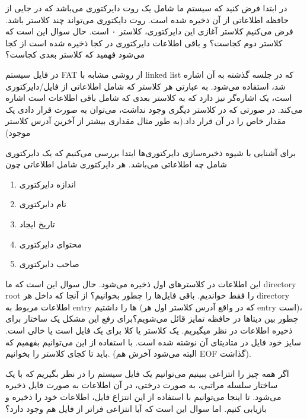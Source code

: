 \begin{flushright}
    در ابتدا فرض کنید که سیستم ما شامل یک روت دایرکتوری می‌باشد که در جایی از حافظه اطلاعاتی از آن ذخیره شده است.
    روت دایکتوری می‌تواند چند کلاستر باشد.
    فرض می‌کنیم کلاستر آغازی این دایرکتوری، کلاستر ۰ است.
    حال سوال این است که کلاستر دوم کجاست؟ و باقی اطلاعات دایرکتوری در کجا ذخیره شده است از کجا می‌شود فهمید که کلاستر بعدی کجاست؟


    در فایل سیستم FAT از روشی مشابه با linked list که در جلسه گذشته به آن اشاره شد، استفاده می‌شود.
    به عبارتی هر کلاستر که شامل اطلاعاتی از فایل/دایرکتوری است، یک اشاره‌گر نیز دارد که به کلاستر بعدی که شامل باقی اطلاعات است اشاره می‌کند.
    در صورتی که در کلاستر دیگری وجود نداشت، می‌توان به صورت قرار دادی یک مقدار خاص را در آن قرار داد.(به طور مثال مقداری بیشتر از آخرین آدرس کلاستر موجود)


    برای آشنایی با شیوه ذخیره‌سازی دایرکتوری‌ها ابتدا بررسی می‌کنیم که یک دایرکتوری شامل چه اطلاعاتی می‌باشد.
    هر دایرکتوری شامل اطلاعاتی چون
    \begin{enumerate}
        \item اندازه دایرکتوری
        \item نام دایرکتوری
        \item تاریخ ایجاد
        \item محتوای دایرکتوری
        \item صاحب دایرکتوری
    \end{enumerate}
    این اطلاعات در کلاستر‌های اول ذخیره می‌شود.
    حال سوال این است که ما directory root را فقط خواندیم.
    باقی فایل‌ها را چطور بخوانیم؟ از آنجا که داخل هر directory اطلاعات مربوط به entry ها را داشتیم (که در واقع آدرس کلاستر اول هر entry است)،
    چطور بین دیتاها در حافظه تمایز قائل می‌شویم؟برای رفع این مشکل یک ساختار برای ذخیره اطلاعات در نظر میگیریم.
    یک کلاستر یا کلا برای یک فایل است یا خالی است.
    سایز خود فایل در متادیتای آن نوشته شده است.
    با استفاده از این می‌توانیم بفهمیم که باید تا کجای کلاستر را بخوانیم. (البته می‌شود آخرش هم EOF گذاشت).

     اگر همه چیز را انتزاعی ببینیم می‌توانیم یک فایل سیستم را در نظر بگیریم که با یک ساختار سلسله مراتبی، به صورت درختی، در آن اطلاعات به صورت فایل ذخیره می‌شود.
     تا اینجا می‌توانیم با استفاده از این انتزاع فایل، اطلاعات خود را ذخیره و بازیابی کنیم.
     اما سوال این است که آیا انتزاعی فراتر از فایل هم وجود دارد؟

\end{flushright}